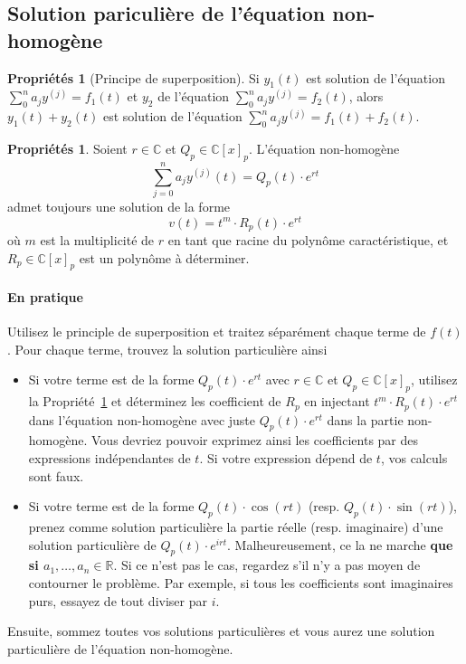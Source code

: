 \documentclass[11pt,a4paper]{article}
\theoremstyle{definition}
\newtheorem{myprop}[mydef]{Propriétés}
\newcommand{\R}{\mathbb{R}}
\newcommand{\C}{\mathbb{C}}
\begin{document}
\subsection{Solution pariculière de l'équation non-homogène}
\begin{myprop}[Principe de superposition]
	Si $y_1(t)$ est solution de l'équation $\sum_0^n a_j y^{(j)} = f_1(t)$ et $y_2$ de l'équation $\sum_0^n a_j y^{(j)} = f_2(t)$,
	alors $y_1(t) + y_2(t)$ est solution de l'équation $\sum_0^n a_j y^{(j)} = f_1(t) + f_2(t)$.
\end{myprop}

\begin{myprop}
	\label{prop:part}
	Soient $r \in \C$ et $Q_p \in \C[x]_p$.
	L'équation non-homogène
	\[ \sum_{j=0}^n a_j y^{(j)}(t) = Q_p(t) \cdot e^{rt} \]
	admet toujours une solution de la forme
	\[ v(t) = t^m \cdot R_p(t) \cdot e^{rt} \]
	où $m$ est la multiplicité de $r$ en tant que racine du polynôme caractéristique,
	et $R_p \in \C[x]_p$ est un polynôme à déterminer.
\end{myprop}

\paragraph{En pratique}
Utilisez le principle de superposition et traitez séparément chaque terme de $f(t)$.
Pour chaque terme, trouvez la solution particulière ainsi
\begin{itemize}
	\item Si votre terme est de la forme $Q_p(t) \cdot e^{rt}$ avec $r \in \C$ et $Q_p \in \C[x]_p$,
		utilisez la Propriété~\ref{prop:part} et déterminez les coefficient de $R_p$ en injectant
		$t^m \cdot R_p(t) \cdot e^{rt}$ dans l'équation non-homogène avec juste $Q_p(t) \cdot e^{rt}$
		dans la partie non-homogène.
		Vous devriez pouvoir exprimez ainsi les coefficients par des expressions indépendantes de $t$.
		Si votre expression dépend de $t$, vos calculs sont faux.
	\item Si votre terme est de la forme $Q_p(t) \cdot \cos(rt)$ (resp. $Q_p(t) \cdot \sin(rt)$),
		prenez comme solution particulière la partie réelle (resp. imaginaire) d'une solution particulière de
		$Q_p(t) \cdot e^{irt}$.
		Malheureusement, ce la ne marche \textbf{que si $a_1, \dots, a_n \in \R$}.
		Si ce n'est pas le cas, regardez s'il n'y a pas moyen de contourner le problème.
		Par exemple, si tous les coefficients sont imaginaires purs, essayez de tout diviser par $i$.
\end{itemize}
Ensuite, sommez toutes vos solutions particulières et vous aurez une solution particulière de l'équation non-homogène.
\end{document}
